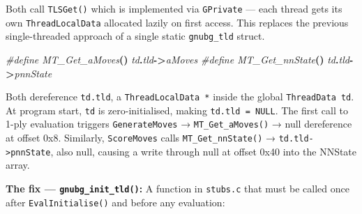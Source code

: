 \documentclass[11pt,a4paper]{article}
\newenvironment{Shaded}{%
  \setlength{\FrameSep}{4pt}%
  \definecolor{shadecolor}{RGB}{245,245,245}%
  \begin{snugshade}\footnotesize
}{\end{snugshade}}
\newcommand{\OperatorTok}[1]{\textcolor[rgb]{0.81,0.36,0.00}{\textbf{#1}}}
\newcommand{\PreprocessorTok}[1]{\textcolor[rgb]{0.56,0.35,0.01}{\textit{#1}}}
\begin{document}
Both call \texttt{TLSGet()} which is implemented via \texttt{GPrivate}
--- each thread gets its own \texttt{ThreadLocalData} allocated lazily
on first access. This replaces the previous single-threaded approach of
a single static \texttt{gnubg\_tld} struct.

\begin{Shaded}
\begin{Highlighting}[]
\PreprocessorTok{\#define MT\_Get\_aMoves}\OperatorTok{()}\PreprocessorTok{   td}\OperatorTok{.}\PreprocessorTok{tld}\OperatorTok{{-}\textgreater{}}\PreprocessorTok{aMoves}
\PreprocessorTok{\#define MT\_Get\_nnState}\OperatorTok{()}\PreprocessorTok{  td}\OperatorTok{.}\PreprocessorTok{tld}\OperatorTok{{-}\textgreater{}}\PreprocessorTok{pnnState}
\end{Highlighting}
\end{Shaded}

Both dereference \texttt{td.tld}, a \texttt{ThreadLocalData\ *} inside
the global \texttt{ThreadData\ td}. At program start, \texttt{td} is
zero-initialised, making \texttt{td.tld\ =\ NULL}. The first call to
1-ply evaluation triggers \texttt{GenerateMoves} →
\texttt{MT\_Get\_aMoves()} → null dereference at offset 0x8. Similarly,
\texttt{ScoreMoves} calls \texttt{MT\_Get\_nnState()} →
\texttt{td.tld-\textgreater{}pnnState}, also null, causing a write
through null at offset 0x40 into the NNState array.

\textbf{The fix --- \texttt{gnubg\_init\_tld()}:} A function in
\texttt{stubs.c} that must be called once after
\texttt{EvalInitialise()} and before any evaluation:
\end{document}
